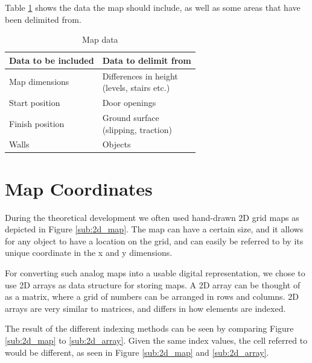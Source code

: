 Table \ref{table:map_data} shows the data the map should include,
as well as some areas that have been delimited from.

\begin{table}[h!]
	\centering
	\caption{Map data}
	\begin{tabular}{|p{}||p{}|}
		\hline
		Data to be included & Data to delimit from \\ 
		\hline
		Map dimensions 		& \parbox[t]{0.4\textwidth}{Differences in height\\(levels, stairs etc.)}\\
		\hline
		Start position 		& Door openings \\
		\hline
		Finish position 	& \parbox[t]{0.4\textwidth}{Ground surface\\(slipping, traction)} \\
		\hline
		Walls 				& Objects\\
		\hline
	\end{tabular}
	\label{table:map_data}
\end{table}


\section{Map Coordinates}
\label{sec:map_coordinates} %
During the theoretical development we often used hand-drawn 2D grid maps as depicted in Figure \ref{sub:2d_map}. The map can have a certain size, and it allows for any object to have a location on the grid, and can easily be referred to by its unique coordinate in the x and y dimensions. 

For converting such analog maps into a usable digital representation, we chose to use 2D arrays as data structure for storing maps. A 2D array can be thought of as a matrix, where a grid of numbers can be arranged in rows and columns. 2D arrays are very similar to matrices, and differs in how elements are indexed.

The result of the different indexing methods can be seen by comparing Figure \ref{sub:2d_map} to \ref{sub:2d_array}. Given the same index values, the cell referred to would be different, as seen in  Figure \ref{sub:2d_map} and \ref{sub:2d_array}.

